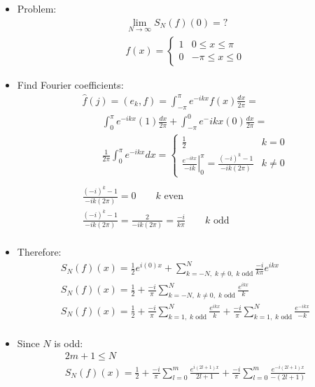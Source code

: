 \documentclass[12pt, a4paper]{article}
\begin{document}
\begin{itemize}
    \item Problem:
    \begin{gather*}
        \lim_{N\to\infty} S_N(f)(0) = ?\\
        f(x)=\begin{cases}
            1 & 0 \leq x \leq \pi\\
            0 & -\pi\leq x \leq 0
        \end{cases}
    \end{gather*}
    \item Find Fourier coefficients:
    \begin{gather*}
        \hat{f}(j) = (e_k, f) = \int_{-\pi}^{\pi} e^{-ikx}f(x)\frac{dx}{2\pi} = \\
        \qquad \int_{0}^{\pi} e^{-ikx}(1)\frac{dx}{2\pi} + \int_{-\pi}^{0} e^-{ikx}(0)\frac{dx}{2\pi} =\\
        \qquad \frac{1}{2\pi}\int_{0}^{\pi} e^{-ikx}dx = \begin{cases}
            \frac{1}{2} & k = 0\\
            \left.\frac{e^{-ikx}}{-ik}\right\rvert^\pi_0 = \frac{(-i)^k-1}{-ik(2\pi)} & k \ne 0
        \end{cases}\\\\
        \frac{(-i)^k-1}{-ik(2\pi)} = 0 \qquad k \text{ even}\\
        \frac{(-i)^k-1}{-ik(2\pi)} = \frac{2}{-ik(2\pi)} = \frac{-i}{k\pi} \qquad k \text{ odd}\\
    \end{gather*}
    \item Therefore:
    \begin{gather*}
        S_N(f)(x) = \frac{1}{2}e^{i(0)x}+\sum_{k=-N,\; k\ne 0,\; k \text{ odd}}^N\frac{-i}{k\pi}e^{ikx}\\
        S_N(f)(x) = \frac{1}{2}+\frac{-i}{\pi}\sum_{k=-N,\; k\ne 0,\; k \text{ odd}}^N\frac{e^{ikx}}{k}\\
        S_N(f)(x) = \frac{1}{2}+\frac{-i}{\pi}\sum_{k=1,\; k \text{ odd}}^N\frac{e^{ikx}}{k}+\frac{-i}{\pi}\sum_{k=1,\; k \text{ odd}}^N\frac{e^{-ikx}}{-k}\\
    \end{gather*}
    \item Since $N$ is odd:
    \begin{gather*}
        2m+1 \leq N\\
        S_N(f)(x) = \frac{1}{2}+\frac{-i}{\pi}\sum_{l=0}^m\frac{e^{i(2l+1)x}}{2l+1}+\frac{-i}{\pi}\sum_{l=0}^m\frac{e^{-i(2l+1)x}}{-(2l+1)}\\

\end{gather*}
\end{itemize}
\end{document}

